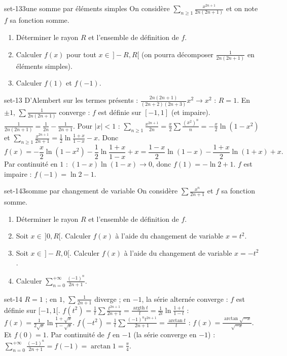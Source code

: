\begin{exo}{set-13}{3}{une somme par éléments simples}
On considère $\sum_{n\geq1}\frac{x^{2n+1}}{2n(2n+1)}$ et on note $f$ sa fonction somme.
\begin{enumerate}
\item Déterminer le rayon $R$ et l'ensemble de définition de $f$.
\item Calculer $f(x)$ pour tout $x\in\,]-R,R[$ (on pourra décomposer $\frac1{2n(2n+1)}$ en éléments simples).
\item Calculer $f(1)$ et $f(-1)$.
\end{enumerate}
\end{exo}

\begin{corrige}{set-13}
 D'Alembert sur les termes présents : $\frac{2n(2n+1)}{(2n+2)(2n+3)}x^2\to x^2$ : $R=1$. En $\pm1$, $\sum\frac1{2n(2n+1)}$ converge : $f$ est définie
sur $[-1,1]$ (et impaire).
 $\frac1{2n(2n+1)}=\frac1{2n}-\frac1{2n+1}$. Pour $|x|<1$ : $\sum_{n\geq1}\frac{x^{2n+1}}{2n}=\frac x2\sum\frac{(x^2)^n}n=-\frac x2\ln(1-x^2)$ et
$\sum_{n\geq1}\frac{x^{2n+1}}{2n+1}=\frac12\ln\frac{1+x}{1-x}-x$. Donc
\[f(x)=-\frac x2\ln(1-x^2)-\frac12\ln\frac{1+x}{1-x}+x=\frac{1-x}2\ln(1-x)-\frac{1+x}2\ln(1+x)+x.\]
 Par continuité en $1$ : $(1-x)\ln(1-x)\to0$, donc $f(1)=-\ln2+1$. $f$ est impaire : $f(-1)=\ln2-1$.
\end{corrige}

\begin{exo}{set-14}{3}{somme par changement de variable}
On considère $\sum\frac{x^n}{2n+1}$ et $f$ sa fonction somme.
\begin{enumerate}
\item Déterminer le rayon $R$ et l'ensemble de définition de $f$.
\item Soit $x\in\,]0,R[$. Calculer $f(x)$ à l'aide du changement de variable $x=t^2$.
\item Soit $x\in\,]-R,0[$. Calculer $f(x)$ à l'aide du changement de variable $x=-t^2$.
\item Calculer $\sum_{n=0}^{+\infty}\frac{(-1)^n}{2n+1}$.
\end{enumerate}
\end{exo}

\begin{corrige}{set-14}
 $R=1$ ; en $1$, $\sum\frac1{2n+1}$ diverge ; en $-1$, la série alternée converge : $f$ est définie sur $[-1,1[$.
 $f(t^2)=\frac1t\sum\frac{t^{2n+1}}{2n+1}=\frac{\operatorname{argth}t}t=\frac1{2t}\ln\frac{1+t}{1-t}$ : $f(x)=\frac1{2\sqrt x}\ln\frac{1+\sqrt x}{1-\sqrt x}$.
 $f(-t^2)=\frac1t\sum\frac{(-1)^nt^{2n+1}}{2n+1}=\frac{\arctan t}t$ : $f(x)=\frac{\arctan\sqrt{-x}}{\sqrt{-x}}$. Et $f(0)=1$.
 Par continuité de $f$ en $-1$ (la série converge en $-1$) : $\sum_{n=0}^{+\infty}\frac{(-1)^n}{2n+1}=f(-1)=\arctan1=\frac\pi4$.
\end{corrige}

